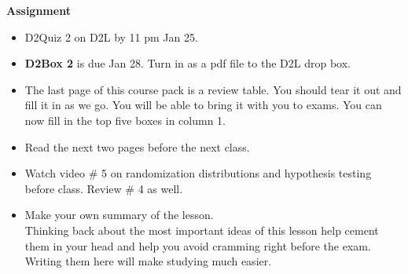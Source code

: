 {\bf Assignment}
\begin{itemize}
\item   D2Quiz 2 on D2L by 11 pm Jan 25.
\item  {\bf D2Box 2} is due Jan 28.  Turn in as a pdf file to the D2L
  drop box.
\item The last page of this course pack  is a review table. You should
  tear it out and fill it in as we go. You will be able to bring it
  with you to exams.  You can now fill in the top five boxes  in column 1.
\item Read the next two pages before the next class.
\item Watch video \#  5 on randomization distributions and
  hypothesis testing before class.  Review \# 4 as well.
 \item 
  Make your own summary of the lesson. \\
  Thinking back about the most important ideas of this lesson help
  cement them in your head and help you avoid cramming right before
  the exam.  Writing them here will make studying much easier.   
\end{itemize}


